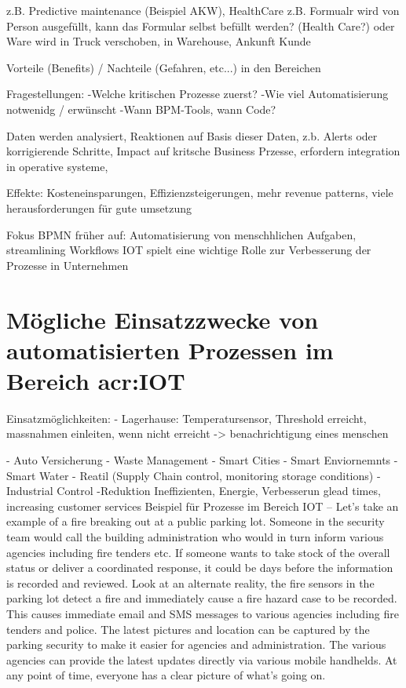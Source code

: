 z.B. Predictive maintenance (Beispiel AKW), HealthCare
z.B. Formualr wird von Person ausgefüllt, kann das Formular selbst befüllt werden? (Health Care?) oder Ware wird in Truck verschoben, in Warehouse, Ankunft Kunde
	
Vorteile (Benefits) / Nachteile (Gefahren, etc...) in den Bereichen

Fragestellungen:
-Welche kritischen Prozesse zuerst?
-Wie viel Automatisierung notwenidg / erwünscht
-Wann BPM-Tools, wann Code?


Daten werden analysiert, Reaktionen auf Basis dieser Daten, z.b. Alerts oder korrigierende Schritte, Impact auf kritsche Business Przesse, erfordern integration in operative systeme, 

Effekte: Kosteneinsparungen, Effizienzsteigerungen, mehr revenue patterns, viele herausforderungen für gute umsetzung

Fokus BPMN früher auf: Automatisierung von menschhlichen Aufgaben, streamlining Workflows
IOT spielt eine wichtige Rolle zur Verbesserung der Prozesse in Unternehmen




\newpage
\section{Mögliche Einsatzzwecke von automatisierten Prozessen im Bereich \gls{acr:IOT}}

Einsatzmöglichkeiten:
- Lagerhause: Temperatursensor, Threshold erreicht, massnahmen einleiten, wenn nicht erreicht -> benachrichtigung eines menschen

- Auto Versicherung
- Waste Management
- Smart Cities
- Smart Enviornemnts
- Smart Water
- Reatil (Supply Chain control, monitoring storage conditions)
-Industrial Control
-Reduktion Ineffizienten, Energie, Verbesserun glead times, increasing customer services
Beispiel für Prozesse im Bereich IOT
--
Let’s take an example of a fire breaking out at a public parking lot. Someone in the security team would call the building administration who would in turn inform various agencies including fire tenders etc. If someone wants to take stock of the overall status or deliver a coordinated response, it could be days before the information is recorded and reviewed. Look at an alternate reality, the fire sensors in the parking lot detect a fire and immediately cause a fire hazard case to be recorded. This causes immediate email and SMS messages to various agencies including fire tenders and police. The latest pictures and location can be captured by the parking security to make it easier for agencies and administration. The various agencies can provide the latest updates directly via various mobile handhelds. At any point of time, everyone has a clear picture of what’s going on.

